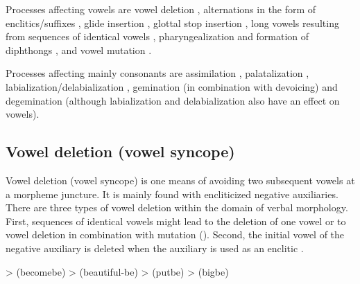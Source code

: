 Processes affecting vowels are vowel deletion , alternations in the form of enclitics\slash suffixes , glide insertion , glottal stop insertion , long vowels resulting from sequences of identical vowels , pharyngealization and formation of diphthongs , and vowel mutation .

Processes affecting mainly consonants are assimilation , palatalization , labialization\slash delabialization , gemination (in combination with devoicing) and degemination  (although labialization and delabialization also have an effect on vowels).



\subsection{Vowel deletion (vowel syncope)}
\label{ssec:Vowel deletion (vowel syncope)}

Vowel deletion (vowel syncope) is one means of avoiding two subsequent vowels at a morpheme juncture. It is mainly found with encliticized negative auxiliaries. There are three types of vowel deletion within the domain of verbal morphology. First, sequences of identical vowels might lead to the deletion of one vowel or to vowel deletion in combination with mutation (). Second, the initial vowel of the negative auxiliary is deleted when the auxiliary is used as an enclitic .
%
\begin{exe}
	\ex	\label{ex:vowel syncope verbs phon}
	\begin{xlist}
		\ex	{} >  (becomebe)			
		\ex	{} >  (beautiful-be)		
		\ex	{} > \newline\hspace*{1em}(putbe) 
		\ex	{} >  (bigbe)
	\end{xlist}
\end{exe}

